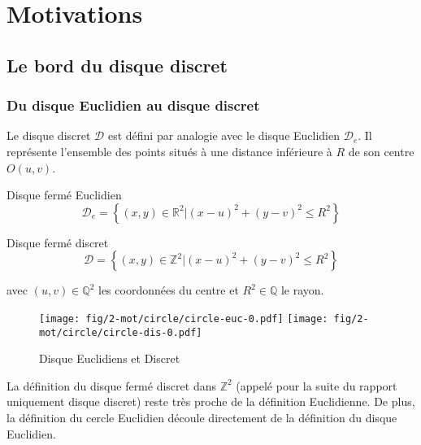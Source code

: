 \section{Motivations}

\subsection{Le bord du disque discret}

\subsubsection{Du disque Euclidien au disque discret}


Le disque discret $\mathcal{D}$ est défini par analogie avec le disque Euclidien $\mathcal{D}_e$. Il représente l'ensemble des points situés à une distance inférieure à $R$ de son centre $O(u,v)$.


\begin{Definition}{Disque fermé Euclidien}
\label{def:disk-euc}
 $$\mathcal{D}_e =  \left\{ (x,y) \in \mathbb{R}^{2} |  (x - u)^2 + (y - v)^2 \leq R^2 \right\}$$
\end{Definition}

\begin{Definition}{Disque fermé discret}
\label{def:disk-dis}
  $$\mathcal{D} =  \left\{ (x,y) \in \mathbb{Z}^{2} |  (x - u)^2 + (y - v)^2 \leq R^2 \right\}$$
  
  avec $(u,v) \in \mathbb{Q}^{2}$ les coordonnées du centre et $R^2 \in \mathbb{Q}$ le rayon.\\
\end{Definition}

\begin{figure}[H]
  \centering
  \texttt{[image: fig/2-mot/circle/circle-euc-0.pdf]}
  \texttt{[image: fig/2-mot/circle/circle-dis-0.pdf]}
  \caption{Disque Euclidiens et Discret}
\end{figure}

La définition du disque fermé discret dans $\mathbb{Z}^{2}$ (appelé pour la suite du rapport uniquement disque discret) reste très proche de la définition Euclidienne. De plus, la définition du cercle Euclidien découle directement de la définition du disque Euclidien.


